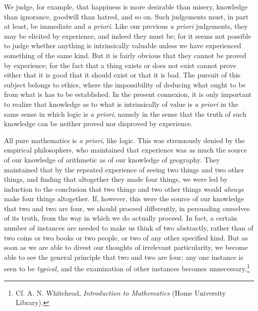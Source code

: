 \documentclass[oneside,letterpaper,12pt]{book}
\begin{document}
\label{thegood} We judge, for example, that happiness is more desirable than misery,
knowledge than ignorance, goodwill than hatred, and so on. Such
judgements must, in part at least, be immediate and \emph{a priori}.
Like our previous \emph{a priori} judgements, they may be elicited by
experience, and indeed they must be; for it seems not possible to judge
whether anything is intrinsically valuable unless we have experienced
something of the same kind. But it is fairly obvious that they cannot be
proved by experience; for the fact that a thing exists or does not exist
cannot prove either that it is good that it should exist or that it is
bad. The pursuit of this subject belongs to ethics, where the
impossibility of deducing what ought to be from what is has to be
established. In the present connexion, it is only important to realize
that knowledge as to what is intrinsically of value is \emph{a priori}
in the same sense in which logic is \emph{a priori}, namely in the sense
that the truth of such knowledge can be neither proved nor disproved by
experience.

\label{puremath} All pure mathematics is \emph{a priori}, like logic. This was
strenuously denied by the empirical philosophers, who maintained that
experience was as much the source of our knowledge of arithmetic as of
our knowledge of geography. They maintained that by the repeated
experience of seeing two things and two other things, and finding that
altogether they made four things, we were led by induction to the
conclusion that two things and two other things would \emph{always} make
four things altogether. If, however, this were the source of our
knowledge that two and two are four, we should proceed differently, in
persuading ourselves of its truth, from the way in which we do actually
proceed. In fact, a certain number of instances are needed to make us
think of two abstractly, rather than of two coins or two books or two
people, or two of any other specified kind. But as soon as we are able
to divest our thoughts of irrelevant particularity, we become able to
see the general principle that two and two are four; any one instance is
seen to be \emph{typical}, and the examination of other instances
becomes unnecessary.\footnote{Cf. A. N. Whitehead, \emph{Introduction to Mathematics} (Home
University Library).}
\end{document}
